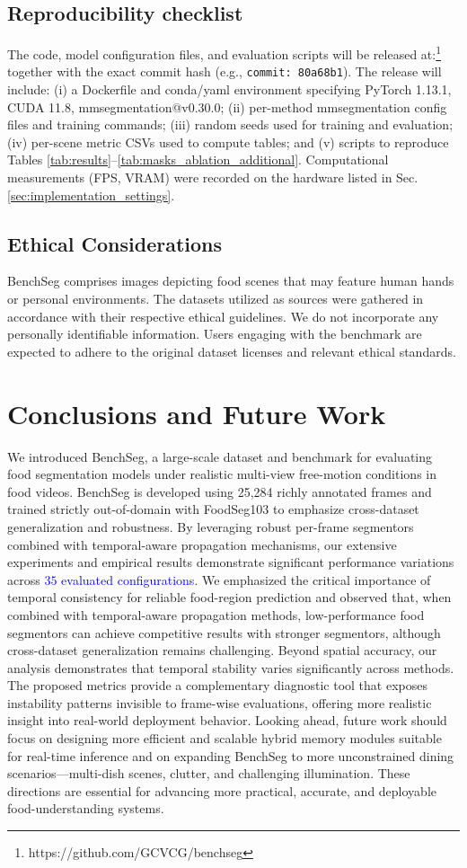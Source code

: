 \documentclass[preprint,12pt]{elsarticle}
\newcommand{\change}[1]{\textcolor{blue}{#1}}
\begin{document}
\subsection{Reproducibility checklist}
The code, model configuration files, and evaluation scripts will be released at:\footnote{https://github.com/GCVCG/benchseg} together with the exact commit hash (e.g., \texttt{commit: 80a68b1}). The release will include: (i) a Dockerfile and conda/yaml environment specifying PyTorch 1.13.1, CUDA 11.8, mmsegmentation@v0.30.0; (ii) per-method mmsegmentation config files and training commands; (iii) random seeds used for training and evaluation; (iv) per-scene metric CSVs used to compute tables; and (v) scripts to reproduce Tables \ref{tab:results}–\ref{tab:masks_ablation_additional}. Computational measurements (FPS, VRAM) were recorded on the hardware listed in Sec. \ref{sec:implementation_settings}.


\subsection{Ethical Considerations}
BenchSeg comprises images depicting food scenes that may feature human hands or personal environments. The datasets utilized as sources were gathered in accordance with their respective ethical guidelines. We do not incorporate any personally identifiable information. Users engaging with the benchmark are expected to adhere to the original dataset licenses and relevant ethical standards.

\section{Conclusions and Future Work}
We introduced BenchSeg, a large-scale dataset and benchmark for evaluating food segmentation models under realistic multi-view free-motion conditions in food videos. BenchSeg is developed using 25,284 richly annotated frames and trained strictly out-of-domain with FoodSeg103 to emphasize cross-dataset generalization and robustness. By leveraging robust per-frame segmentors combined with temporal-aware propagation mechanisms, our extensive experiments and empirical results demonstrate significant performance variations across \change{$35$ evaluated configurations}. We emphasized the critical importance of temporal consistency for reliable food-region prediction and observed that, when combined with temporal-aware propagation methods, low-performance food segmentors can achieve competitive results with stronger segmentors, although cross-dataset generalization remains challenging.
Beyond spatial accuracy, our analysis demonstrates that temporal stability varies significantly across methods. The proposed metrics provide a complementary diagnostic tool that exposes instability patterns invisible to frame-wise evaluations, offering more realistic insight into real-world deployment behavior.
Looking ahead, future work should focus on designing more efficient and scalable hybrid memory modules suitable for real-time inference and on expanding BenchSeg to more unconstrained dining scenarios—multi-dish scenes, clutter, and challenging illumination. These directions are essential for advancing more practical, accurate, and deployable food-understanding systems.
\end{document}

